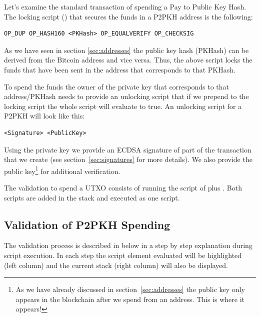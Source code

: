 Let’s examine the standard transaction of spending a Pay to Public Key Hash. The locking script () that secures the funds in a P2PKH address is the following:

\begin{emphbox}
\begin{verbatim}
OP_DUP OP_HASH160 <PKHash> OP_EQUALVERIFY OP_CHECKSIG
\end{verbatim}
\end{emphbox}

As we have seen in section \ref{sec:addresses} the public key hash (PKHash) can be derived from the Bitcoin address and vice versa. Thus, the above script locks the funds that have been sent in the address that corresponds to that PKHash.

To spend the funds the owner of the private key that corresponds to that address/PKHash needs to provide an unlocking script that if we prepend to the locking script the whole script will evaluate to true. An unlocking script for a P2PKH will look like this:

\begin{emphbox}
\begin{verbatim}
<Signature> <PublicKey>
\end{verbatim}
\end{emphbox}

Using the private key we provide an ECDSA signature of part of the transaction that we create (see section~\ref{sec:signatures} for more details). We also provide the public key\footnote{As we have already discussed in section~\ref{sec:addresses} the public key only appears in the blockchain after we spend from an address. This is where it appears!} for additional verification.

The validation to spend a UTXO consists of running the script of  plus . Both scripts are added in the stack and executed as one script.

\subsection*{Validation of P2PKH Spending}
The validation process is described in below in a step by step explanation during script execution. In each step the script element evaluated will be highlighted (left column) and the current stack (right column) will also be displayed.

